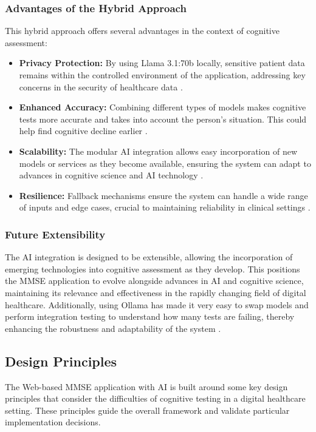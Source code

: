 \subsubsection{Advantages of the Hybrid Approach}
This hybrid approach offers several advantages in the context of cognitive assessment:
\begin{itemize}
\item \textbf{Privacy Protection:} By using Llama 3.1:70b locally, sensitive patient data remains within the controlled environment of the application, addressing key concerns in the security of healthcare data \cite{Krutz2017}.
\item \textbf{Enhanced Accuracy:} Combining different types of models makes cognitive tests more accurate and takes into account the person's situation. This could help find cognitive decline earlier \cite{Grassi2019}.
\item \textbf{Scalability:} The modular AI integration allows easy incorporation of new models or services as they become available, ensuring the system can adapt to advances in cognitive science and AI technology \cite{Zygouris2017}.
\item \textbf{Resilience:} Fallback mechanisms ensure the system can handle a wide range of inputs and edge cases, crucial to maintaining reliability in clinical settings \cite{Bauer2012}.
\end{itemize}

\subsubsection{Future Extensibility}
The AI integration is designed to be extensible, allowing the incorporation of emerging technologies into cognitive assessment as they develop. This positions the MMSE application to evolve alongside advances in AI and cognitive science, maintaining its relevance and effectiveness in the rapidly changing field of digital healthcare. Additionally, using Ollama has made it very easy to swap models and perform integration testing to understand how many tests are failing, thereby enhancing the robustness and adaptability of the system \cite{Ollama2024, Zygouris2017}.

\subsection{Design Principles}
The Web-based MMSE application with AI is built around some key design principles that consider the difficulties of cognitive testing in a digital healthcare setting. These principles guide the overall framework and validate particular implementation decisions.

